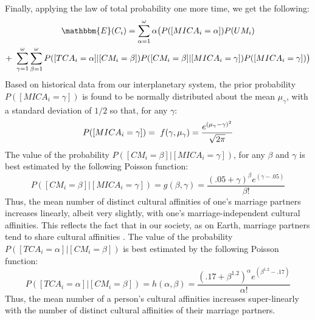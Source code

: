 Finally, applying the law of total probability one more time, we get the following:
\begin{multline}
    \mathbbm{E}(C_{i})=\sum_{\alpha=1}^{\omega}\alpha\big(P([MICA_{i}=\alpha])P(UM_{i}) \\ + \    \sum_{\gamma=1}^{\omega}\sum_{\beta=1}^{\omega} P([TCA_{i}=\alpha]|[CM_{i}=\beta]) P([CM_{i}=\beta]|[MICA_{i}=\gamma])P([MICA_{i}=\gamma])\big)
\end{multline}
Based on historical data from our interplanetary system, the prior probability $P([MICA_{i}=\gamma])$ is found to be normally distributed about the mean $\mu_{\gamma}$, with a standard deviation of $1/2$ so that, for any $\gamma$:
\begin{equation}
    P([MICA_{i}=\gamma]) \\ = \ f(\gamma,\mu_{\gamma})=\frac{e^{(\mu_{\gamma}-\gamma)^{2}}}{\sqrt{2\pi}}
\end{equation}
The value of the probability $P([CM_{i}=\beta]|[MICA_{i}=\gamma])$, for any $\beta$ and $\gamma$ is best estimated by the following Poisson function:
\begin{equation}
    P([CM_{i}=\beta]|[MICA_{i}=\gamma])= g(\beta,\gamma)=\frac{(.05+\gamma)^{\beta}e^{(\gamma-.05)}}{\beta!}
\end{equation}
Thus, the mean number of distinct cultural affinities of one's marriage partners increases linearly, albeit very slightly, with one's marriage-independent cultural affinities. This reflects the fact that in our society, as on Earth, marriage partners tend to share cultural affinities \cite{Schwartz2013}. The value of the probability $P([TCA_{i}=\alpha]|[CM_{i}=\beta])$ is best estimated by the following Poisson function:
\begin{equation}
    P([TCA_{i}=\alpha]|[CM_{i}=\beta]) = h(\alpha,\beta)=\frac{(.17+\beta^{1.2})^{\alpha}e^{(\beta^{1.2}-.17)}}{\alpha!}
\end{equation}
Thus, the mean number of a person's cultural affinities increases super-linearly with the number of distinct cultural affinities of their marriage partners.\par 

